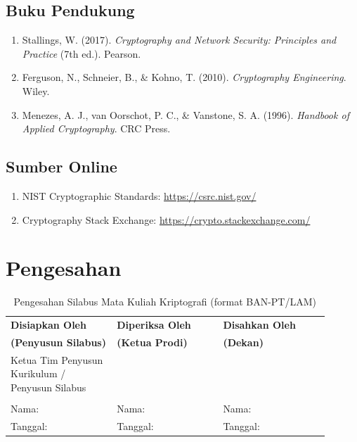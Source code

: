 \documentclass[12pt,a4paper]{article}
\begin{document}
\subsection{Buku Pendukung}
\begin{enumerate}
\item Stallings, W. (2017). \textit{Cryptography and Network Security: Principles and Practice} (7th ed.). Pearson.
\item Ferguson, N., Schneier, B., \& Kohno, T. (2010). \textit{Cryptography Engineering}. Wiley.
\item Menezes, A. J., van Oorschot, P. C., \& Vanstone, S. A. (1996). \textit{Handbook of Applied Cryptography}. CRC Press.
\end{enumerate}

\subsection{Sumber Online}
\begin{enumerate}
\item NIST Cryptographic Standards: \url{https://csrc.nist.gov/}
\item Cryptography Stack Exchange: \url{https://crypto.stackexchange.com/}
\end{enumerate}

\section{Pengesahan}

\begin{table}[!htbp]
\centering
\small
\begin{tabular}{|>{\centering\arraybackslash}p{0.3\linewidth}|>{\centering\arraybackslash}p{0.3\linewidth}|>{\centering\arraybackslash}p{0.3\linewidth}|}
\hline
\textbf{Disiapkan Oleh} & \textbf{Diperiksa Oleh} & \textbf{Disahkan Oleh} \\
\textbf{(Penyusun Silabus)} & \textbf{(Ketua Prodi)} & \textbf{(Dekan)} \\
\hline
Ketua Tim Penyusun Kurikulum / Penyusun Silabus & & \\
\hline
 & & \\[1.2cm]
Nama: \underline{\hspace{2.8cm}} & Nama: \underline{\hspace{2.8cm}} & Nama: \underline{\hspace{2.8cm}} \\
Tanggal: \underline{\hspace{2.8cm}} & Tanggal: \underline{\hspace{2.8cm}} & Tanggal: \underline{\hspace{2.8cm}} \\
\hline
\end{tabular}
\caption{Pengesahan Silabus Mata Kuliah Kriptografi (format BAN-PT/LAM)}
\end{table}
\end{document}
